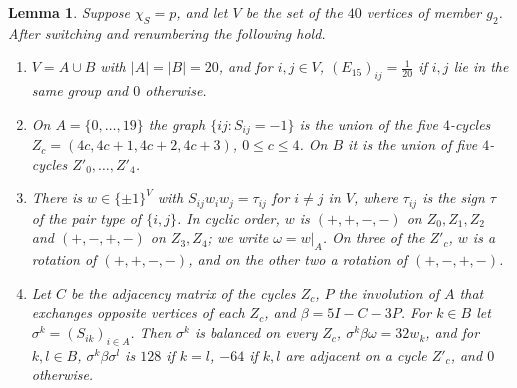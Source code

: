 \documentclass[11pt]{article}
\newtheorem{lemma}[theorem]{Lemma}
\theoremstyle{definition}
\begin{document}
\begin{lemma}\label{lem:s525}
Suppose $\chi_S=p$, and let $V$ be the set of the $40$ vertices of member $g_2$. After switching and
renumbering the following hold.
\begin{enumerate}
\item[(i)] $V=A\cup B$ with $|A|=|B|=20$, and for $i,j\in V$, $(E_{15})_{ij}=\frac1{20}$ if $i,j$ lie in the
same group and $0$ otherwise.
\item[(ii)] On $A=\{0,\dots,19\}$ the graph $\{ij:S_{ij}=-1\}$ is the union of the five $4$-cycles
$Z_c=(4c,4c+1,4c+2,4c+3)$, $0\le c\le4$. On $B$ it is the union of five $4$-cycles $Z'_0,\dots,Z'_4$.
\item[(iii)] There is $w\in\{\pm1\}^V$ with $S_{ij}w_iw_j=\tau_{ij}$ for $i\ne j$ in $V$, where $\tau_{ij}$
is the sign $\tau$ of the pair type of $\{i,j\}$. In cyclic order, $w$ is $(+,+,-,-)$ on $Z_0,Z_1,Z_2$
and $(+,-,+,-)$ on $Z_3,Z_4$; we write $\omega=w|_A$. On three of the $Z'_c$, $w$ is a rotation of
$(+,+,-,-)$, and on the other two a rotation of $(+,-,+,-)$.
\item[(iv)] Let $C$ be the adjacency matrix of the cycles $Z_c$, $P$ the involution of $A$ that exchanges
opposite vertices of each $Z_c$, and $\beta=5I-C-3P$. For $k\in B$ let $\sigma^k=(S_{ik})_{i\in A}$. Then
$\sigma^k$ is balanced on every $Z_c$, $\sigma^k\beta\omega=32w_k$, and for $k,l\in B$,
$\sigma^k\beta\sigma^l$ is $128$ if $k=l$, $-64$ if $k,l$ are adjacent on a cycle $Z'_c$, and $0$
otherwise.
\end{enumerate}
\end{lemma}
\end{document}
